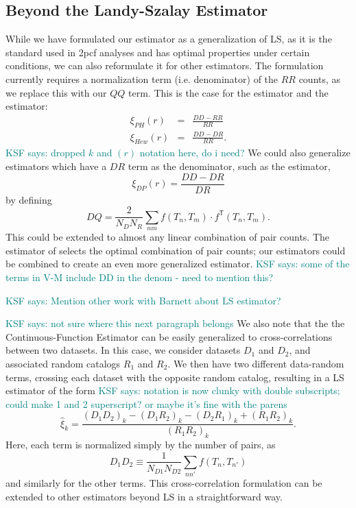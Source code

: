 \documentclass[modern]{aastex62}
\newcommand{\cf}{2pcf\xspace} %
\newcommand{\est}{the Continuous-Function Estimator\xspace}
\newcommand{\LS}{LS\xspace}
\newcommand{\T}{^{\mathsf{T}}}
\newcommand{\KSF}[1]{\textcolor{teal}{KSF says: #1}}
\begin{document}
\label{ref:beyondls}
\subsection{Beyond the Landy-Szalay Estimator}

While we have formulated our estimator as a generalization of \LS, as it is the standard used in \cf analyses and has optimal properties under certain conditions, we can also reformulate it for other estimators.
The formulation currently requires a normalization term (i.e. denominator) of the $RR$ counts, as we replace this with our $QQ$ term.
This is the case for the \cite{PeeblesHauser1974} estimator and the \cite{Hewett1982} estimator:
\begin{eqnarray}
    \xi_{PH}(r) &=& \frac{DD - RR}{RR} \\
    \xi_{Hew}(r) &=& \frac{DD - DR}{RR}.
\end{eqnarray}
\KSF{dropped $k$ and $(r)$ notation here, do i need?}
We could also generalize estimators which have a $DR$ term as the denominator, such as the \cite{DavisPeebles1983} estimator,
\begin{equation}
    \xi_{DP}(r) = \frac{DD - DR}{DR}
\end{equation}
by defining
\begin{equation}
    DQ = \frac{2}{N_D N_R} \sum_{n m} f(T_n, T_m) \cdot f\T(T_n, T_m).
\end{equation}
This could be extended to almost any linear combination of pair counts.
The estimator of \cite{VargasMagana2013} selects the optimal combination of pair counts; our estimators could be combined to create an even more generalized estimator.
\KSF{some of the terms in V-M include DD in the denom - need to mention this?}

\KSF{Mention other work with Barnett about LS estimator?}

\KSF{not sure where this next paragraph belongs}
We also note that the \est can be easily generalized to cross-correlations between two datasets.
In this case, we consider datasets $D_1$ and $D_2$, and associated random catalogs $R_1$ and $R_2$. 
We then have two different data-random terms, crossing each dataset with the opposite random catalog, resulting in a \LS estimator of the form
\KSF{notation is now clunky with double subscripts; could make 1 and 2 superscript? or maybe it's fine with the parens}
\begin{equation}
    \hat{\xi}_k = \frac{(D_1 D_2)_k - (D_1 R_2)_k - (D_2 R_1)_k + (R_1 R_2)_k}{(R_1 R_2)_k}.
\end{equation}
Here, each term is normalized simply by the number of pairs, as
\begin{equation}
    D_1 D_2 \equiv \frac{1}{N_{D1} N_{D2}} \sum_{n n'} f(T_n, T_{n'})
\end{equation}
and similarly for the other terms.
This cross-correlation formulation can be extended to other estimators beyond \LS in a straightforward way.
\end{document}

